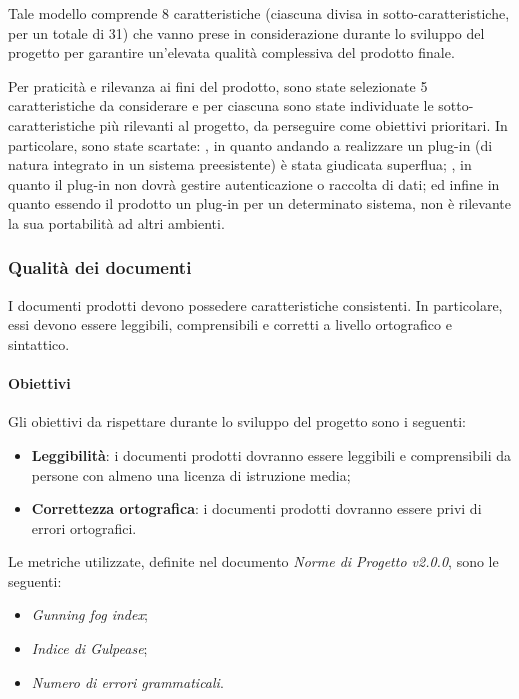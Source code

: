 Tale modello comprende 8 caratteristiche (ciascuna divisa in sotto-caratteristiche, per un totale di 31) che vanno prese in considerazione durante lo sviluppo del progetto per garantire un'elevata qualità complessiva del prodotto finale.

Per praticità e rilevanza ai fini del prodotto, sono state selezionate 5 caratteristiche da considerare e per ciascuna sono state individuate le sotto-caratteristiche più rilevanti al progetto, da perseguire come obiettivi prioritari. In particolare, sono state scartate: , in quanto andando a realizzare un plug-in (di natura integrato in un sistema preesistente) è stata giudicata superflua; , in quanto il plug-in non dovrà gestire autenticazione o raccolta di dati; ed infine  in quanto essendo il prodotto un plug-in per un determinato sistema, non è rilevante la sua portabilità ad altri ambienti.

\subsubsection{Qualità dei documenti}
I documenti prodotti devono possedere caratteristiche consistenti. In particolare, essi devono essere leggibili, comprensibili e corretti a livello ortografico e sintattico.
\paragraph{Obiettivi} \Spazio
Gli obiettivi da rispettare durante lo sviluppo del progetto sono i seguenti:
	\begin{itemize}
		\item{\textbf{Leggibilità}: i documenti prodotti dovranno essere leggibili e comprensibili da persone con almeno una licenza di istruzione media;}
		\item{\textbf{Correttezza ortografica}: i documenti prodotti dovranno essere privi di errori ortografici.}
	\end{itemize}

Le metriche utilizzate, definite nel documento \emph{Norme di Progetto v2.0.0}, sono le seguenti:

\begin{itemize}
		\item{\emph{Gunning fog index};}
		\item{\emph{Indice di Gulpease};}
		\item{\emph{Numero di errori grammaticali}.}
\end{itemize}

